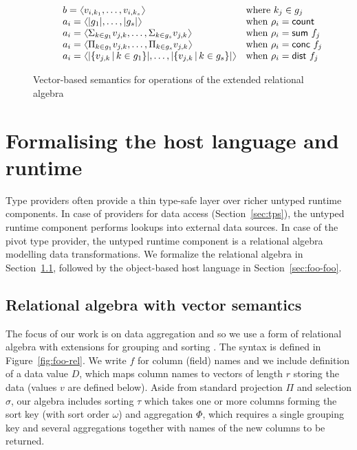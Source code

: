 \documentclass[a4paper,UKenglish]{lipics-v2016}
\theoremstyle{plain}
\theoremstyle{definition}
\newcommand{\vect}[1]{\langl #1 \rangl}
\newcommand{\langl}{\begin{picture}(4.5,7)
\put(1.1,2.5){\rotatebox{60}{\line(1,0){5.5}}}
\put(1.1,2.5){\rotatebox{300}{\line(1,0){5.5}}}
\end{picture}}
\newcommand{\rangl}{\begin{picture}(4.5,7)
\put(.9,2.5){\rotatebox{120}{\line(1,0){5.5}}}
\put(.9,2.5){\rotatebox{240}{\line(1,0){5.5}}}
\end{picture}}
\newcommand{\ident}[1]{\textnormal{\sffamily #1}}
\begin{document}
\begin{figure}
\begin{equation*}
\begin{array}{l}
\begin{array}{ll}
    \qquad b = \vect{v_{i,k_1},\ldots,v_{i, k_s}} & \textnormal{where}~k_j \in g_j \\
    \qquad a_i = \vect{|g_1|, \ldots, |g_s|}  & \textnormal{when}~\rho_i = \ident{count} \\
    \qquad a_i = \vect{\Sigma_{k\in g_1}v_{j,k}, \ldots, \Sigma_{k\in g_s}v_{j,k}} & \textnormal{when}~\rho_i = \ident{sum}~f_j \\
    \qquad a_i = \vect{\Pi_{k\in g_1}v_{j,k}, \ldots, \Pi_{k\in g_s}v_{j,k}}   & \textnormal{when}~\rho_i = \ident{conc}~f_j \\
    \qquad a_i = \vect{|\{v_{j,k}\,|\, k\in g_1\}|, \ldots, |\{v_{j,k}\,|\, k\in g_s\}|}  & \textnormal{when}~\rho_i = \ident{dist}~f_j \\
  \end{array}\\
\end{array}
\end{equation*}

\caption{Vector-based semantics for operations of the extended relational algebra}
\label{fig:foo-relsem}
\end{figure}


\section{Formalising the host language and runtime}
\label{sec:foo}

Type providers often provide a thin type-safe layer over richer untyped runtime components. In case 
of providers for data access (Section~\ref{sec:tps}), the untyped runtime component performs lookups
into external data sources. In case of the pivot type provider, the untyped runtime component 
is a relational algebra modelling data transformations. We formalize the relational algebra in 
Section~\ref{sec:foo-rel}, followed by the object-based host language in Section~\ref{sec:foo-foo}.

\subsection{Relational algebra with vector semantics}
\label{sec:foo-rel}

The focus of our work is on data aggregation and so we use a form of relational algebra with 
extensions for grouping and sorting \cite{relalg,dbsys}. The syntax is defined in Figure~\ref{fig:foo-rel}.
We write $f$ for column (field) names and we include definition of a data value $D$, which maps
column names to vectors of length $r$ storing the data (values $v$ are defined below).
Aside from standard projection $\Pi$ and selection $\sigma$, our algebra includes sorting 
$\tau$ which takes one or more columns forming the sort key (with sort order $\omega$)
and aggregation $\Phi$, which requires a single grouping key and several aggregations together with 
names of the new columns to be returned.
\end{document}
